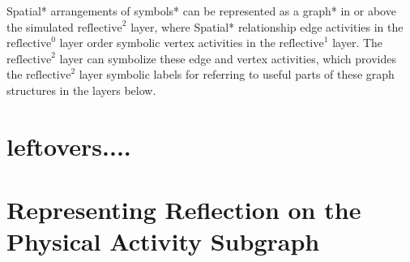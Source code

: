 Spatial* arrangements of symbols* can be represented as a graph* in or
above the simulated $\text{reflective}^2$ layer, where Spatial*
relationship edge activities in the $\text{reflective}^0$ layer order
symbolic vertex activities in the $\text{reflective}^1$ layer.  The
$\text{reflective}^2$ layer can symbolize these edge and vertex
activities, which provides the $\text{reflective}^2$ layer symbolic
labels for referring to useful parts of these graph structures in the
layers below.

 \noindent










\section{leftovers....}

\section{Representing Reflection on the Physical Activity Subgraph}

